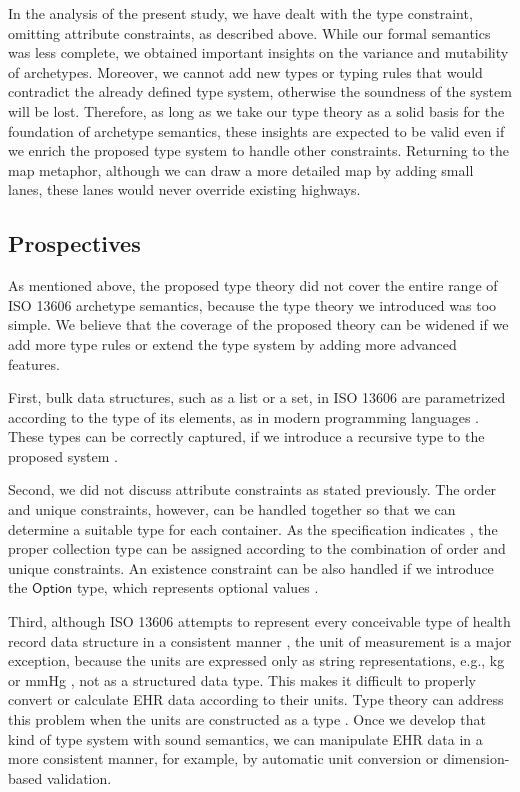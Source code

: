 \documentclass[preprint,3p,onecolumn,times,review]{article}
\begin{document}
{In the analysis of the present study, we have dealt with the type constraint, omitting attribute constraints, as described above.
While our formal semantics was less complete, we obtained important insights on the variance and mutability of archetypes.
Moreover, we cannot add new types or typing rules that would contradict the already defined type system, otherwise the soundness of the system will be lost.
Therefore, as long as we take our type theory as a solid basis for the foundation of archetype semantics, these insights are expected to be valid even if we enrich the proposed type system to handle other constraints.
Returning to the map metaphor, although we can draw a more detailed map by adding small lanes, these lanes would never override existing highways.


\subsection{Prospectives}

As mentioned above, the proposed type theory did not cover the entire range of ISO 13606 archetype semantics, because the type theory we introduced was too simple.
We believe that the coverage of the proposed theory can be widened if we add more type rules or extend the type system by adding more advanced features.

First, bulk data structures, such as a list or a set, in ISO 13606 are parametrized according to the type of its elements, as in modern programming languages \cite[p.42]{iso08:13606_healt_elect_part1}.
These types can be correctly captured, if we introduce a recursive type to the proposed system \cite{cardelli04:_type_system,geuvers09:_introd_type_theor}.
  
Second, we did not discuss attribute constraints as stated previously.
The order and unique constraints, however, can be handled together so that we can determine a suitable type for each container. As the specification indicates \cite[p.84]{iso08:13606_healt_elect_part2}, the proper collection type can be assigned according to the combination of order and unique constraints.
An existence constraint can be also handled if we introduce the $\mathsf{Option}$ type, which represents optional values \cite[p.137]{pierce02:_types_progr_languag}.


Third, although ISO 13606 attempts to represent every conceivable type of health record data structure in a consistent manner \cite[vi]{iso08:13606_healt_elect_part1}, the unit of measurement is a major exception, because the units are expressed only as string representations, e.g., kg or mmHg \cite[p.46,p.82]{iso08:13606_healt_elect_part2}, not as a structured data type. This makes it difficult to properly convert or calculate EHR data according to their units. Type theory can address this problem when the units are constructed as a type \cite{kennedy94:_dimen_types,kennedy10:_types_units_measur}. Once we develop that kind of type system with sound semantics, we can manipulate EHR data in a more consistent manner, for example, by automatic unit conversion or dimension-based validation.

}
\end{document}
